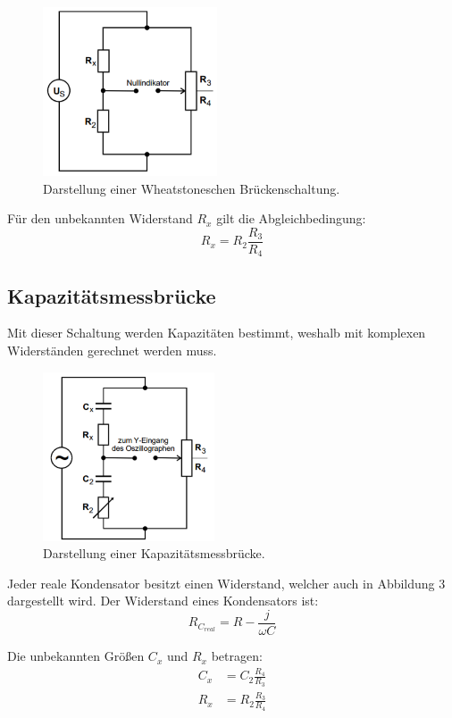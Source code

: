 \begin{figure}[H]
  \centering
  \includegraphics[height=5cm]{wheat.PNG}
  \caption{Darstellung einer Wheatstoneschen Brückenschaltung. \cite{sample}}
  \label{fig:Wheat}
\end{figure}

Für den unbekannten Widerstand $R_x$ gilt die Abgleichbedingung:
\begin{equation}
  R_x = R_2 \frac{R_3}{R_4}
\end{equation}

\subsection{Kapazitätsmessbrücke}
Mit dieser Schaltung werden Kapazitäten bestimmt, weshalb mit komplexen Widerständen gerechnet werden muss.

\begin{figure}[H]
  \centering
  \includegraphics[height=5cm]{kapazitaet.PNG}
  \caption{Darstellung einer Kapazitätsmessbrücke. \cite{sample}}
  \label{fig:kapazität}
\end{figure}

Jeder  reale Kondensator besitzt einen Widerstand, welcher auch in Abbildung 3 dargestellt wird.
Der Widerstand eines Kondensators ist:
\begin{equation}
  R_{C_{real}} = R - \frac{j}{\omega C}
\end{equation}

Die unbekannten Größen $C_x$ und $R_x$ betragen:
\begin{align}
  C_x &= C_2 \frac{R_4}{R_3} \\
  R_x &= R_2 \frac{R_3}{R_4}
\end{align}

